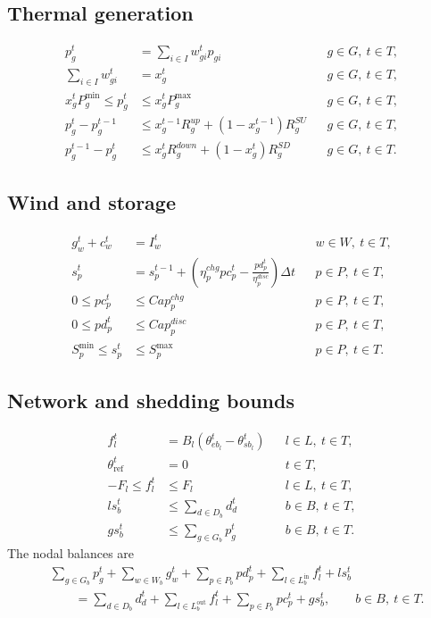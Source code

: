 \documentclass[11pt,a4paper]{article}
\begin{document}
\subsection*{Thermal generation}
\begin{align}
p_g^t&=\sum_{i\in I}w_{gi}^t p_{gi}
&&g\in G,\ t\in T,\\
\sum_{i\in I}w_{gi}^t&=x_g^t
&&g\in G,\ t\in T,\\
x_g^tP_g^{\min}\leq p_g^t&\leq x_g^tP_g^{\max}
&&g\in G,\ t\in T,\\
p_g^t-p_g^{t-1}&\leq x_g^{t-1}R_g^{up}+(1-x_g^{t-1})R_g^{SU}
&&g\in G,\ t\in T,\\
p_g^{t-1}-p_g^t&\leq x_g^tR_g^{down}+(1-x_g^t)R_g^{SD}
&&g\in G,\ t\in T.
\end{align}

\subsection*{Wind and storage}
\begin{align}
g_w^t+c_w^t&=I_w^t
&&w\in W,\ t\in T,\\
s_p^t&=s_p^{t-1}+\left(\eta_p^{chg}pc_p^t-\frac{pd_p^t}{\eta_p^{disc}}\right)\Delta t
&&p\in P,\ t\in T,\\
0\leq pc_p^t&\leq Cap_p^{chg}
&&p\in P,\ t\in T,\\
0\leq pd_p^t&\leq Cap_p^{disc}
&&p\in P,\ t\in T,\\
S_p^{\min}\leq s_p^t&\leq S_p^{\max}
&&p\in P,\ t\in T.
\end{align}

\subsection*{Network and shedding bounds}
\begin{align}
f_l^t&=B_l\left(\theta_{eb_l}^t-\theta_{sb_l}^t\right)
&&l\in L,\ t\in T,\\
\theta_{\mathrm{ref}}^t&=0
&&t\in T,\\
-F_l\leq f_l^t&\leq F_l
&&l\in L,\ t\in T,\\
ls_b^t&\leq\sum_{d\in D_b}d_d^t
&&b\in B,\ t\in T,\\
gs_b^t&\leq\sum_{g\in G_b}p_g^t
&&b\in B,\ t\in T.
\end{align}
The nodal balances are
\begin{equation}
\begin{aligned}
&\sum_{g\in G_b}p_g^t+\sum_{w\in W_b}g_w^t
+\sum_{p\in P_b}pd_p^t+\sum_{l\in L_b^{\mathrm{in}}}f_l^t+ls_b^t\\
&\qquad=\sum_{d\in D_b}d_d^t
+\sum_{l\in L_b^{\mathrm{out}}}f_l^t
+\sum_{p\in P_b}pc_p^t+gs_b^t,
\qquad b\in B,\ t\in T.
\end{aligned}
\end{equation}
\end{document}
